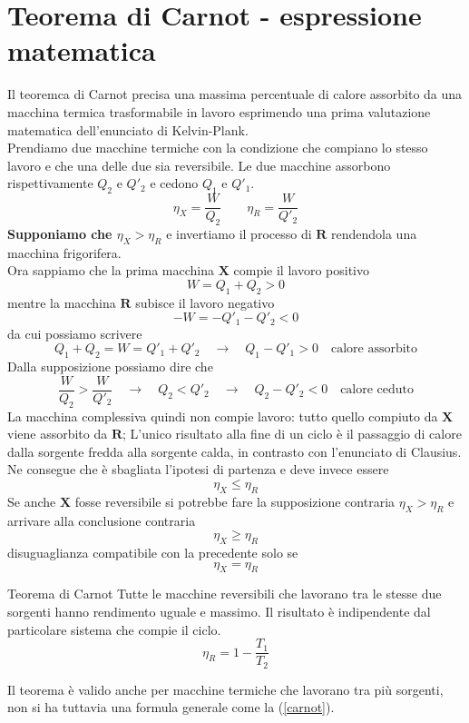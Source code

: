 \documentclass[x11names]{report}
\begin{document}
	\section{Teorema di Carnot - espressione matematica}
	Il teoremca di Carnot precisa una massima percentuale di calore assorbito da una macchina termica trasformabile in lavoro esprimendo una prima valutazione matematica dell'enunciato di Kelvin-Plank.\\
	
	\noindent
	Prendiamo due macchine termiche con la condizione che compiano lo stesso lavoro e che una delle due sia reversibile. Le due macchine assorbono rispettivamente \(Q_{2}\) e \(Q'_{2}\) e cedono \(Q_{1}\) e \(Q'_{1}\). 
	\[ 
	\eta_X = \frac{W}{Q_{2}} \qquad \eta_R = \frac{W}{Q'_{2}}
	\]
	\textbf{Supponiamo che \(\eta_X > \eta_R\)} e invertiamo il processo di \(\boldsymbol{R}\) rendendola una macchina frigorifera. \\
	
	\noindent
	Ora sappiamo che la prima macchina \(\boldsymbol{X}\) compie il lavoro positivo
	\[ 
	W = Q_{1} + Q_{2} > 0
	\]
	mentre la macchina \(\boldsymbol{R}\) subisce il lavoro negativo
	\[ 
	-W = -Q'_{1} - Q'_{2} < 0
	\]
	da cui possiamo scrivere
	\[ 
	Q_{1} + Q_{2} = W = Q'_{1} + Q'_{2}  \quad \to \quad \boxed{Q_{1} - Q'_{1} > 0} \quad \text{calore assorbito}
	\]
	Dalla supposizione possiamo dire che
	\[ 
	\frac{W}{Q_{2}} >  \frac{W}{Q'_{2}} \quad \to \quad Q_{2} < Q'_{2}  \quad \to \quad  \boxed{Q_{2} - Q'_{2} < 0} \quad \text{calore ceduto}
	\]
	La macchina complessiva quindi non compie lavoro: tutto quello compiuto da \(\boldsymbol{X}\) viene assorbito da \(\boldsymbol{R}\); L'unico risultato alla fine di un ciclo è il passaggio di calore dalla sorgente fredda alla sorgente calda, in contrasto con l’enunciato di Clausius. Ne consegue che è sbagliata l’ipotesi di partenza e deve invece essere
	\[ 
	\eta_X \leq \eta_R
	\]
	Se anche \(\boldsymbol{X}\) fosse reversibile si potrebbe fare la supposizione contraria \(\eta_X > \eta_R\) e arrivare alla conclusione contraria
	\[ 
	\eta_X \geq \eta_R
	\]
	disuguaglianza compatibile con la precedente solo se
	\[ 
	\eta_X = \eta_R
	\]
	\begin{center}
		\colorbox{yred}{\begin{minipage}{5.75in}
				\begin{redes}{Teorema di Carnot}
					Tutte le macchine reversibili che lavorano tra le stesse due sorgenti hanno rendimento uguale e massimo. Il risultato è indipendente dal particolare sistema che compie il ciclo.
					\begin{equation}\label{carnot}
						\eta_R = 1 - \frac{T_{1}}{T_{2}}
					\end{equation}
				\end{redes}
		\end{minipage}}
	\end{center}
	Il teorema è valido anche per macchine termiche che lavorano tra più sorgenti, non si ha tuttavia una formula generale come la (\ref{carnot}).\\
	
\end{document}
